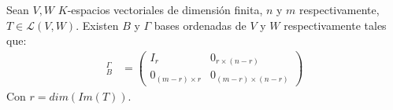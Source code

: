 \begin{proposition}{}{}
    Sean $V, W$ $K$-espacios vectoriales de dimensión finita, $n$ y $m$ respectivamente, $T \in \mathcal{L}(V,W)$. Existen $B$ y $\Gamma$ bases ordenadas de $V$ y $W$ respectivamente tales que:
    \begin{align*}
        [T]_B^\Gamma &= \begin{pmatrix}
            I_r & 0_{r \times (n - r)}\\
            0_{(m-r)\times r} & 0_{(m-r)\times (n-r)}
        \end{pmatrix}
    \end{align*}
    Con $r = dim(Im(T))$.
\end{proposition}